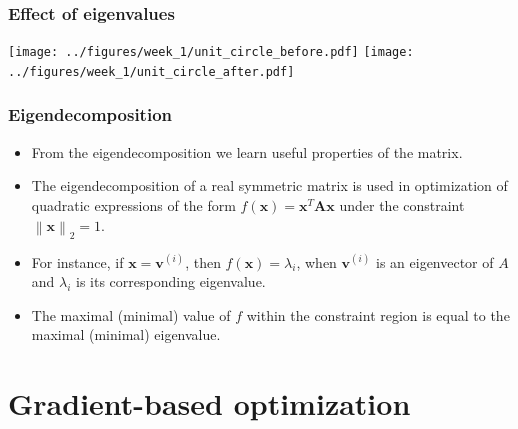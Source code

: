 \documentclass[notes]{beamer}          %
\newcommand{\vect}[1]{\bm{#1}}
\newcommand{\norm}[1]{\left\lVert#1\right\rVert}
\providecommand{\norm}[1]{\lVert#1\rVert}
\newif\iffull
\begin{document}
\begin{frame}
\frametitle{Effect of eigenvalues}

\begin{center}
\texttt{[image: ../figures/week\_1/unit\_circle\_before.pdf]}
\hfill
\texttt{[image: ../figures/week\_1/unit\_circle\_after.pdf]}
\end{center}

\end{frame}


\begin{frame}
\frametitle{Eigendecomposition}
    \begin{itemize}
        \item From the eigendecomposition we learn useful properties of the matrix.
        \item The eigendecomposition of a real symmetric matrix is used in optimization of quadratic expressions of the form $f(\vect{x}) = \vect{x}^T \vect{A} \vect{x}$ under the constraint $\norm{\vect{x}}_2 = 1$.
        \item For instance, if $\vect{x}=\vect{v}^{(i)}$, then $f(\vect{x}) = \lambda_i$, when $\vect{v}^{(i)}$ is an eigenvector of $A$ and $\lambda_i$ is its corresponding eigenvalue.
        \item The maximal (minimal) value of $f$ within the constraint region is equal to the maximal (minimal) eigenvalue.
    \end{itemize}

\end{frame}
\fi


\iffull
\begin{frame}
\frametitle{Trace}
    \begin{itemize}
        \item A {\bf trace} of a matrix is defined as
        $$Tr(\vect{A}) = \sum_{i} \vect{A}_{i,i} $$
        \item Expressions in terms of the trace operators allow to exploit many useful identities, e.g.
        $$Tr(\vect{A}\vect{B}\vect{C}) = Tr(\vect{B}\vect{C}\vect{A}) = Tr(\vect{C}\vect{A}\vect{B})$$
    \end{itemize}

\end{frame}
\fi

\fi %

\section{Gradient-based optimization}
\end{document}
